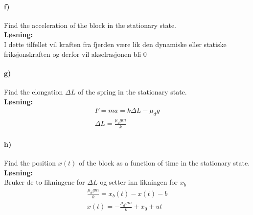 \documentclass[11pt, A4paper,norsk]{article}
\begin{document}
		\paragraph{f)}
			\begin{flushleft}
Find the acceleration of the block in the stationary state. \\
\vspace{1mm}
\textbf{Løsning:} \\
\vspace{1mm}
I dette tilfellet vil kraften fra fjerden være lik den dynamiske eller statiske friksjonskraften og derfor vil akselrasjonen bli $0$
			\end{flushleft}









		\paragraph{g)}
			\begin{flushleft}
Find the elongation $\Delta L$ of the spring in the stationary state. \\
\vspace{1mm}
\textbf{Løsning:} \\
\vspace{1mm}
				\begin{align}
F = ma = k \Delta L - \mu_d g \\
\Delta L = \frac{\mu_d g m}{k}
				\end{align}
			\end{flushleft}









		\paragraph{h)}
			\begin{flushleft}
Find the position $x(t)$ of the block as a function of time in the stationary state. \\
\vspace{1mm}
\textbf{Løsning:} \\
\vspace{1mm}
Bruker de to likningene for $\Delta L$ og setter inn likningen for $x_b$
				\begin{align}
\frac{\mu_d g m}{k} = x_b(t) - x(t) - b \\
x(t) = -\frac{\mu_d g m}{k} + x_0 + ut
				\end{align}
			\end{flushleft}
\end{document}
